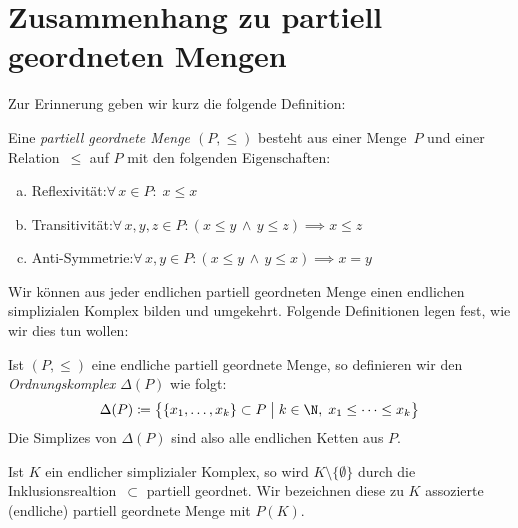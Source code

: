 \section{Zusammenhang zu partiell geordneten Mengen}
Zur Erinnerung geben wir kurz die folgende Definition:

\begin{thDef}
    Eine \emph{partiell geordnete Menge $(P,\leq)$} besteht aus einer Menge~$P$
    und einer Relation~$\leq$ auf $P$ mit den folgenden Eigenschaften:
    \begin{enumerate}[a)]
        \item
            Reflexivität:\quad $\forall\, x\in P\colon\; x \leq x$
        \item
            Transitivität:\quad $\forall\, x,y,z\in P\colon 
            (x\leq y \,\wedge\, y\leq z) \implies x \leq z$
        \item
            Anti-Symmetrie:\quad $\forall\, x,y\in P\colon
            (x\leq y \,\wedge\, y\leq x) \implies x = y$
    \end{enumerate}
\end{thDef}

Wir können aus jeder endlichen partiell geordneten Menge einen endlichen 
simplizialen Komplex bilden und umgekehrt.
Folgende Definitionen legen fest, wie wir dies tun wollen:

\begin{thDef}[Ordnungskomplex]
    Ist $(P,\leq)$ eine endliche partiell geordnete Menge, so definieren wir den
    \emph{Ordnungskomplex $\Delta(P)$} wie folgt:
    \[ \Delta(P) \defeq \bigl\{ \{x_1,\ldots,x_k\} \subset P \cMid[\;]\big 
        k\in\N,\; x_1\leq \dots \leq x_k \bigr\}
    \]
    Die Simplizes von $\Delta(P)$ sind also alle endlichen Ketten aus $P$.
\end{thDef}

\begin{thDef}
    Ist $K$ ein endlicher simplizialer Komplex, so wird
    $K\setminus\{\emptyset\}$ durch die Inklusionsrealtion~$\subset$ partiell
    geordnet. Wir bezeichnen diese zu $K$ assozierte (endliche) 
    partiell geordnete Menge mit $P(K)$.
\end{thDef}

